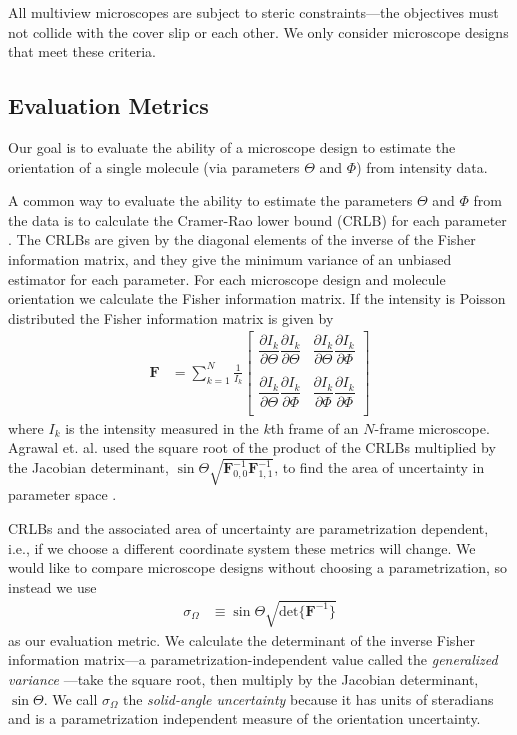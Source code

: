 \documentclass[10pt]{article}
\providecommand{\mb}[1]{\mathbf{#1}}
\begin{document}
All multiview microscopes are subject to steric constraints---the objectives
must not collide with the cover slip or each other. We only consider microscope
designs that meet these criteria.

\subsection{Evaluation Metrics}\label{metrics}
Our goal is to evaluate the ability of a microscope design to estimate the
orientation of a single molecule (via parameters $\Theta$ and $\Phi$) from
intensity data.

A common way to evaluate the ability to estimate the parameters $\Theta$ and
$\Phi$ from the data is to calculate the Cramer-Rao lower bound (CRLB) for each
parameter \cite{kay1993}. The CRLBs are given by the diagonal elements of the
inverse of the Fisher information matrix, and they give the minimum variance of
an unbiased estimator for each parameter. For each microscope design and
molecule orientation we calculate the Fisher information matrix. If the
intensity is Poisson distributed the Fisher information matrix is given by
\begin{align}
  \mb{F} &= \sum_{k=1}^N \frac{1}{I_k}
  \begin{bmatrix}
    \dfrac{\partial I_k}{\partial \Theta}\dfrac{\partial I_k}{\partial \Theta}&\dfrac{\partial I_k}{\partial \Theta}\dfrac{\partial I_k}{\partial \Phi}\\\\
    \dfrac{\partial I_k}{\partial \Theta}\dfrac{\partial I_k}{\partial \Phi}&\dfrac{\partial I_k}{\partial \Phi}\dfrac{\partial I_k}{\partial \Phi}\\    
  \end{bmatrix}
\end{align}
where $I_k$ is the intensity measured in the $k$th frame of an $N$-frame
microscope. Agrawal et. al. used the square root of the product of the CRLBs
multiplied by the Jacobian determinant,
$\sin\Theta\sqrt{\mb{F}^{-1}_{0,0}\mb{F}^{-1}_{1,1}}$, to find the area of
uncertainty in parameter space \cite{agrawal2012}.

CRLBs and the associated area of uncertainty are parametrization dependent,
i.e., if we choose a different coordinate system these metrics will change. We
would like to compare microscope designs without choosing a parametrization, so
instead we use
\begin{align}
  \sigma_{\Omega} &\equiv \sin\Theta\sqrt{\text{det}\{\mb{F}^{-1}\}}
\end{align}
as our evaluation metric. We calculate the determinant of the inverse Fisher
information matrix---a parametrization-independent value called the
\emph{generalized variance} \cite{anderson1958}---take the square root, then
multiply by the Jacobian determinant, $\sin\Theta$. We call $\sigma_{\Omega}$
the \emph{solid-angle uncertainty} because it has units of steradians and is a
parametrization independent measure of the orientation uncertainty.
\end{document}

